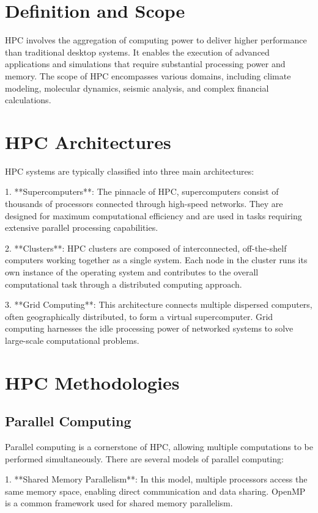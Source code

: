 \section{Definition and Scope}

HPC involves the aggregation of computing power to deliver higher performance than traditional desktop systems. It enables the execution of advanced applications and simulations that require substantial processing power and memory. The scope of HPC encompasses various domains, including climate modeling, molecular dynamics, seismic analysis, and complex financial calculations.

\section{HPC Architectures}

HPC systems are typically classified into three main architectures:

1. **Supercomputers**: The pinnacle of HPC, supercomputers consist of thousands of processors connected through high-speed networks. They are designed for maximum computational efficiency and are used in tasks requiring extensive parallel processing capabilities.

2. **Clusters**: HPC clusters are composed of interconnected, off-the-shelf computers working together as a single system. Each node in the cluster runs its own instance of the operating system and contributes to the overall computational task through a distributed computing approach.

3. **Grid Computing**: This architecture connects multiple dispersed computers, often geographically distributed, to form a virtual supercomputer. Grid computing harnesses the idle processing power of networked systems to solve large-scale computational problems.

\section{HPC Methodologies}

\subsection{Parallel Computing}

Parallel computing is a cornerstone of HPC, allowing multiple computations to be performed simultaneously. There are several models of parallel computing:

1. **Shared Memory Parallelism**: In this model, multiple processors access the same memory space, enabling direct communication and data sharing. OpenMP is a common framework used for shared memory parallelism.

